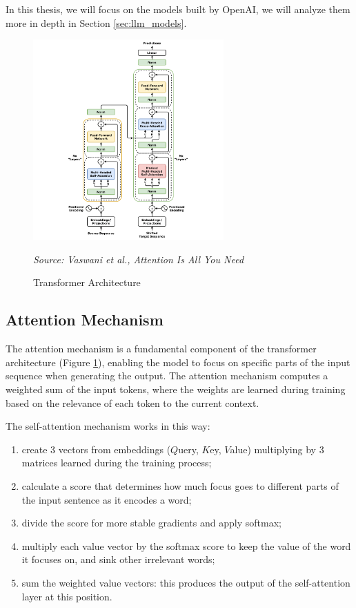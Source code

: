In this thesis, we will focus on the models built by OpenAI, we will analyze them
more in depth in Section \ref{sec:llm_models}.

\begin{figure}[h!]
  \centering
  \includegraphics[width=0.65\textwidth]{images/transformer_architecture.png}
  \caption{Transformer Architecture}
  {\emph{Source: Vaswani et al., Attention Is All You Need \cite{vaswani2023attentionneed}}}
  \label{fig:transformer_architecture}
\end{figure}

\subsection{Attention Mechanism}
\label{sub:attention_mechanism}

The attention mechanism is a fundamental component of the transformer architecture
(Figure \ref{fig:transformer_architecture}), enabling the model to focus on
specific parts of the input sequence when generating the output. The attention mechanism
computes a weighted sum of the input tokens, where the weights are learned
during training based on the relevance of each token to the current context.

The self-attention mechanism works in this way:
\begin{enumerate}
  \item create 3 vectors from embeddings ($Q$uery, $K$ey, $V$alue) multiplying
    by 3 matrices learned during the training process;

  \item calculate a score that determines how much focus goes to different parts
    of the input sentence as it encodes a word;

  \item divide the score for more stable gradients and apply softmax;

  \item multiply each value vector by the softmax score to keep the value of the
    word it focuses on, and sink other irrelevant words;

  \item sum the weighted value vectors: this produces the output of the self-attention
    layer at this position.
\end{enumerate}

